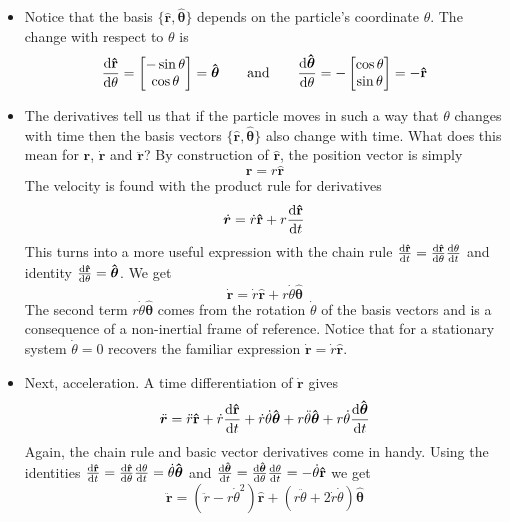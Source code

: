 \documentclass[11pt, a4paper]{article}
\newcommand{\eqtext}[1]{\qquad \text{#1} \qquad}
\newcommand{\bdot}[1]{\dot{\bm{#1}}} %
\newcommand{\bddot}[1]{\ddot{\bm{#1}}} %
\newcommand{\uvec}[1]{\bm{\hat{\mathbf{#1}}}} %
\begin{document}
\begin{itemize}
	\item Notice that the basis $ \{\uvec{r}, \uvec{\theta} \} $ depends on the particle's coordinate $ \theta $. The change with respect to $ \theta $ is
	\begin{equation*}
		\dv{\uvec{r}}{\theta} = 
		\begin{bmatrix}
 			- \sin \theta\\
 			\cos \theta
 		\end{bmatrix} = \uvec{\theta} \eqtext{and}
 		\dv{\uvec{\theta}}{\theta} = - 
 		\begin{bmatrix}
			\cos \theta\\
			\sin \theta
		\end{bmatrix} = - \uvec{r}
	\end{equation*}
	
	\item The derivatives tell us that if the particle moves in such a way that $ \theta $ changes with time then the basis vectors $ \{\uvec{r}, \uvec{\theta} \} $ also change with time. What does this mean for $ \bm{r} $, $ \bdot{r} $ and $ \bddot{r} $? By construction of $ \uvec{r} $, the position vector is simply
	\begin{equation*}
		\bm{r} = r \uvec{r}
	\end{equation*}
	The velocity is found with the product rule for derivatives
	\begin{equation*}
		\bdot{r} = \dot{r}\uvec{r} + r \dv{\uvec{r}}{t}
	\end{equation*}
	This turns into a more useful expression with the chain rule $ \dv{\uvec{r}}{t} = \dv{\uvec{r}}{\theta} \dv{\theta}{t} $ and identity $ \dv{\uvec{r}}{\theta}  = \uvec{\theta} $. We get
	\begin{equation*}
		\bdot{r} = \dot{r}\uvec{r} + r\dot{\theta} \uvec{\theta} 
	\end{equation*}
	The second term $ r\dot{\theta} \uvec{\theta} $ comes from the rotation $ \dot{\theta} $ of the basis vectors and is a consequence of a non-inertial frame of reference. Notice that for a stationary system $ \dot{\theta} = 0 $ recovers the familiar expression $ \bdot{r} = \dot{r}\uvec{r} $.
	
	\item Next, acceleration. A time differentiation of $ \bdot{r} $ gives
	\begin{equation*}
		\bddot{r} = \ddot{r}\uvec{r} + \dot{r}\dv{\uvec{r}}{t}
		+ \dot{r}\dot{\theta} \uvec{\theta} + r\ddot{\theta} \uvec{\theta} + r\dot{\theta} \dv{\uvec{\theta} }{t}
	\end{equation*}
	Again, the chain rule and basic vector derivatives come in handy. Using the identities $ \dv{\uvec{r}}{t} = \dv{\uvec{r}}{\theta} \dv{\theta}{t} = \dot{\theta} \uvec{\theta}$ and $ \dv{\uvec{\theta}}{t} = \dv{\uvec{\theta}}{\theta} \dv{\theta}{t} = - \dot{\theta} \uvec{r}$ we get
	\begin{equation*}
		\bddot{r} = (\ddot{r} - r\dot{\theta}^{2}) \uvec{r} + (r \ddot{\theta} + 2 \dot{r} \dot{\theta}) \uvec{\theta}
	\end{equation*}
	

\end{itemize}
\end{document}

